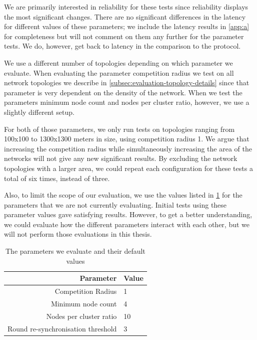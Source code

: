 We are primarily interested in reliability for these tests since reliability displays the most significant changes. There are no significant differences in the latency for different values of these parameters; we include the latency results in \cref{app:a} for completeness but will not comment on them any further for the parameter tests. We do, however, get back to latency in the comparison to the \atwo{} protocol.

We use a different number of topologies depending on which parameter we evaluate. When evaluating the parameter competition radius we test on all network topologies we describe in \cref{subsec:evaluation-topology-details} since that parameter is very dependent on the density of the network. When we test the parameters minimum node count and nodes per cluster ratio, however, we use a slightly different setup.

For both of those parameters, we only run tests on topologies ranging from 100x100 to 1300x1300 meters in size, using competition radius 1. We argue that increasing the competition radius while simultaneously increasing the area of the networks will not give any new significant results. By excluding the network topologies with a larger area, we could repeat each configuration for these tests a total of six times, instead of three.

Also, to limit the scope of our evaluation, we use the values listed in \cref{tab:parameter-default-values} for the parameters that we are not currently evaluating. Initial tests using these parameter values gave satisfying results. However, to get a better understanding, we could evaluate how the different parameters interact with each other, but we will not perform those evaluations in this thesis.

\begin{table}[bt]
\centering
\caption{The parameters we evaluate and their default values}
\label{tab:parameter-default-values}
\begin{tabular}{r|l}
\textbf{Parameter}                 & \textbf{Value} \\ \hline
Competition Radius                 & 1              \\
Minimum node count                 & 4              \\
Nodes per cluster ratio            & 10             \\
Round re-synchronisation threshold & 3             
\end{tabular}
\end{table}

